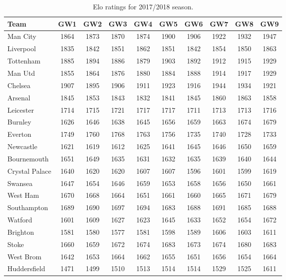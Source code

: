\begin{table}[H]
\centering
\smaller
\begin{tabular}{|l|c|c|c|c|c|c|c|c|c|}
\hline
Team           & GW1  & GW2  & GW3  & GW4  & GW5  & GW6  & GW7  & GW8  & GW9   \\
\hline
Man City       & 1864 & 1873 & 1870 & 1874 & 1900 & 1906 & 1922 & 1932 & 1947  \\
Liverpool      & 1835 & 1842 & 1851 & 1862 & 1851 & 1842 & 1854 & 1850 & 1863  \\
Tottenham      & 1885 & 1894 & 1886 & 1879 & 1903 & 1892 & 1912 & 1915 & 1929  \\
Man Utd        & 1855 & 1864 & 1876 & 1880 & 1884 & 1888 & 1914 & 1917 & 1929  \\
Chelsea        & 1907 & 1895 & 1906 & 1911 & 1923 & 1916 & 1944 & 1934 & 1921  \\
Arsenal        & 1845 & 1853 & 1843 & 1832 & 1841 & 1845 & 1860 & 1863 & 1858  \\
Leicester      & 1714 & 1715 & 1721 & 1717 & 1717 & 1711 & 1713 & 1713 & 1716  \\
Burnley        & 1626 & 1646 & 1638 & 1645 & 1656 & 1659 & 1663 & 1674 & 1679  \\
Everton        & 1749 & 1760 & 1768 & 1763 & 1756 & 1735 & 1740 & 1728 & 1733  \\
Newcastle      & 1621 & 1619 & 1612 & 1625 & 1641 & 1645 & 1646 & 1650 & 1659  \\
Bournemouth    & 1651 & 1649 & 1635 & 1631 & 1632 & 1635 & 1639 & 1640 & 1644  \\
Crystal Palace & 1640 & 1620 & 1620 & 1607 & 1607 & 1596 & 1601 & 1599 & 1619  \\
Swansea        & 1647 & 1654 & 1646 & 1659 & 1653 & 1658 & 1656 & 1650 & 1661  \\
West Ham       & 1670 & 1668 & 1664 & 1651 & 1661 & 1660 & 1665 & 1671 & 1679  \\
Southampton    & 1689 & 1690 & 1697 & 1694 & 1683 & 1688 & 1691 & 1685 & 1688  \\
Watford        & 1601 & 1609 & 1627 & 1623 & 1645 & 1633 & 1652 & 1654 & 1672  \\
Brighton       & 1581 & 1580 & 1577 & 1581 & 1598 & 1589 & 1606 & 1603 & 1611  \\
Stoke          & 1660 & 1659 & 1672 & 1674 & 1683 & 1673 & 1674 & 1680 & 1683  \\
West Brom      & 1642 & 1653 & 1664 & 1662 & 1655 & 1651 & 1656 & 1654 & 1664  \\
Huddersfield   & 1471 & 1499 & 1510 & 1513 & 1514 & 1514 & 1529 & 1525 & 1611  \\
\hline
\end{tabular}
\caption{Elo ratings for 2017/2018 season.}
\label{tab:elo_values_gameweeks_1}
\end{table}


